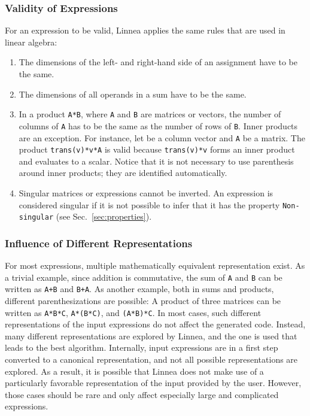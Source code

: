 \documentclass[
  12pt,
  a4paper,
]{scrartcl}
\begin{document}
\subsubsection{Validity of Expressions}

For an expression to be valid, Linnea applies the same rules that are used in linear algebra:
\begin{enumerate}
  \item The dimensions of the left- and right-hand side of an assignment have to be the same.
  \item The dimensions of all operands in a sum have to be the same.
  \item In a product \texttt{A*B}, where \texttt{A} and \texttt{B} are matrices or vectors, the number of columns of \texttt{A} has to be the same as the number of rows of \texttt{B}. Inner products are an exception. For instance, let  be a column vector and \texttt{A} be a matrix. The product \texttt{trans(v)*v*A} is valid because \texttt{trans(v)*v} forms an inner product and evaluates to a scalar. Notice that it is not necessary to use parenthesis around inner products; they are identified automatically.
  \item Singular matrices or expressions cannot be inverted. An expression is considered singular if it is not possible to infer that it has the property \texttt{Non-singular} (see Sec.~\ref{sec:properties}).
\end{enumerate}

\subsubsection{Influence of Different Representations}

For most expressions, multiple mathematically equivalent representation exist. As a trivial example, since addition is commutative, the sum of \texttt{A} and \texttt{B} can be written as \texttt{A+B} and \texttt{B+A}. As another example, both in sums and products, different parenthesizations are possible: A product of three matrices can be written as \texttt{A*B*C}, \texttt{A*(B*C)}, and \texttt{(A*B)*C}. In most cases, such different representations of the input expressions do not affect the generated code. Instead, many different representations are explored by Linnea, and the one is used that leads to the best algorithm. 
Internally, input expressions are in a first step converted to a canonical representation, and not all possible representations are explored. As a result, it is possible that Linnea does not make use of a particularly favorable representation of the input provided by the user. However, those cases should be rare and only affect especially large and complicated expressions.
\end{document}
